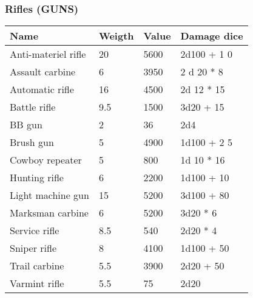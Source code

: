 
\subsubsection{Rifles (GUNS)}
\begin{longtable}{|p{4cm}|p{1.5cm}|p{1.5cm}|p{9cm}|}
\hline
\bfseries Name & \bfseries Weigth & \bfseries Value & \bfseries Damage dice \\
\hline
\endhead
Anti-materiel rifle & 20 & 5600 & 2d100 +  1 0 \\
Assault carbine & 6 & 3950 & 2 d 20  *  8 \\
Automatic rifle  & 16 & 4500 & 2d 12  *  15 \\
Battle rifle & 9.5  & 1500 & 3d20 + 15 \\
BB gun  & 2 & 36 & 2d4 \\
Brush gun  & 5 & 4900 & 1d100  +  2 5 \\
Cowboy repeater  & 5 & 800 & 1d 10  *  16 \\
Hunting rifle  & 6 & 2200 & 1d100 + 10 \\
Light machine gun  & 15 & 5200 & 3d100 + 80 \\
Marksman carbine  & 6 & 5200 & 3d20  *  6 \\
Service rifle  & 8.5  & 540 & 2d20  *  4 \\
Sniper rifle  & 8 & 4100 & 1d100 + 50 \\
Trail carbine  & 5.5  & 3900 & 2d20 + 50 \\
Varmint rifle  & 5.5  & 75 & 2d20 \\
\hline
\end{longtable}
